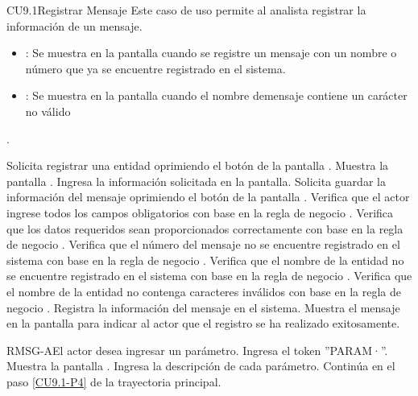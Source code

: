 \begin{UseCase}{CU9.1}{Registrar Mensaje}{
		Este caso de uso permite al analista registrar la información de un mensaje.
	}
{\begin{itemize}
		\item {}: Se muestra en la pantalla  cuando se registre un mensaje con un nombre o número que ya se encuentre registrado en el sistema.
		\item {}: Se muestra en la pantalla  cuando el nombre demensaje contiene un carácter no válido
		\end{itemize}.
		}
	\end{UseCase}
	\begin{UCtrayectoria}
		\UCpaso[\UCactor] Solicita registrar una entidad oprimiendo el botón  de la pantalla .
		\UCpaso[\UCsist] Muestra la pantalla .
		\UCpaso[\UCactor] Ingresa la información solicitada en la pantalla. \label{CU9.1-P3} 
		\UCpaso[\UCactor] Solicita guardar la información del mensaje oprimiendo el botón  de la pantalla . \label{CU9.1-P4}  
		\UCpaso[\UCsist] Verifica que el actor ingrese todos los campos obligatorios con base en la regla de negocio . 
		\UCpaso[\UCsist] Verifica que los datos requeridos sean proporcionados correctamente con base en la regla de negocio .  
		\UCpaso[\UCsist] Verifica que el número del mensaje no se encuentre registrado en el sistema con base en la regla de negocio . 
		\UCpaso[\UCsist] Verifica que el nombre de la entidad no se encuentre registrado en el sistema con base en la regla de negocio . 
		\UCpaso[\UCsist] Verifica que el nombre de la entidad no contenga caracteres inválidos con base en la regla de negocio .  
		\UCpaso[\UCsist] Registra la información del mensaje en el sistema.
		\UCpaso[\UCsist] Muestra el mensaje  en la pantalla  para indicar al actor que el registro se ha realizado exitosamente.
	\end{UCtrayectoria}		
	
	\begin{UCtrayectoriaA}{RMSG-A}{El actor desea ingresar un parámetro.}
		\UCpaso[\UCactor] Ingresa el token ''PARAM·''.
		\UCpaso[\UCsist] Muestra la pantalla .
		\UCpaso[\UCactor] Ingresa la descripción de cada parámetro.
		\UCpaso[\UCsist] Continúa en el paso \ref{CU9.1-P4} de la trayectoria principal.
	\end{UCtrayectoriaA}


